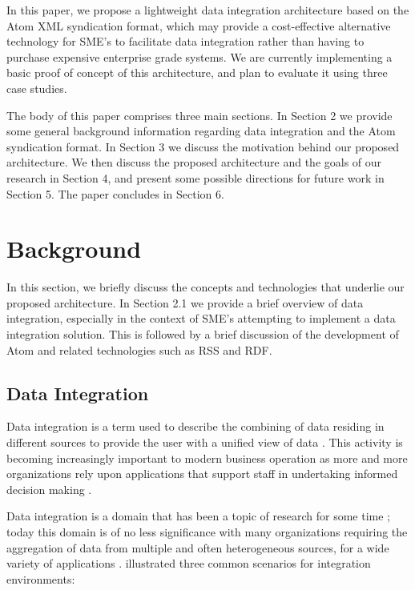 \documentclass{CRPITStyle}
\begin{document}
In this paper, we propose a lightweight data integration architecture
based on the Atom XML syndication format, which may provide a
cost-effective alternative technology for SME's to facilitate data
integration rather than having to purchase expensive enterprise grade
systems. We are currently implementing a basic proof of concept of this
architecture, and plan to evaluate it using three case studies.

The body of this paper comprises three main sections. In Section 2 we
provide some general background information regarding data integration
and the Atom syndication format. In Section 3 we discuss the motivation
behind our proposed architecture. We then discuss the proposed
architecture and the goals of our research in Section 4, and present
some possible directions for future work in Section 5. The paper
concludes in Section 6.

\section{Background}

In this section, we briefly discuss the concepts and technologies that
underlie our proposed architecture. In Section 2.1 we provide a brief
overview of data integration, especially in the context of SME's
attempting to implement a data integration solution. This is followed by
a brief discussion of the development of Atom and related technologies
such as RSS and RDF.

\subsection{Data Integration}

Data integration is a term used to describe the combining of data
residing in different sources to provide the user with a unified view of
data \cite{Bati-C-1986,Yu-C-2004-SIGMOD}. This activity is becoming
increasingly important to modern business operation as more and more
organizations rely upon applications that support staff in undertaking
informed decision making \cite{Calv-D-1998-CoopIS,Yu-C-2004-SIGMOD}.

Data integration is a domain that has been a topic of research for some
time \cite{Beck-R-2002-Bled,Wied-G-1993-SIGMOD}; today this domain is of
no less significance with many organizations requiring the aggregation
of data from multiple and often heterogeneous sources, for a wide
variety of applications \cite{Haas-LM-1999-DEB}.
 illustrated three common scenarios for
integration environments:
\end{document}
